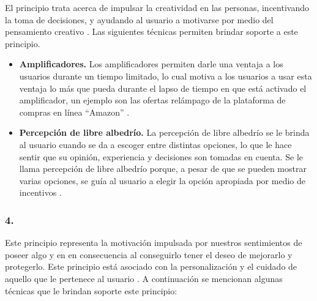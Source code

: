  El principio trata acerca de impulsar la creatividad en las personas, incentivando la toma de
 decisiones, y ayudando al usuario a motivarse por medio del pensamiento creativo \cite[p. 126]{Octalysis}.
 Las siguientes técnicas permiten brindar soporte a este principio.

    \begin{itemize}
    \item
    {\bf Amplificadores.}
        Los amplificadores permiten darle una ventaja a los usuarios durante un tiempo limitado,
        lo cual motiva a los usuarios a usar esta ventaja lo más que pueda durante el lapso de tiempo
        en que está activado el amplificador, un ejemplo son las ofertas relámpago de la plataforma
        de compras en línea ``Amazon'' \cite[p. 146]{Octalysis}.


    \item
    {\bf Percepción de libre albedrío.}
        La percepción de libre albedrío se le brinda al usuario cuando se da a escoger entre distintas
        opciones, lo que le hace sentir que su opinión, experiencia y decisiones son tomadas en cuenta.
        Se le llama percepción de libre albedrío porque, a pesar de que se pueden mostrar varias opciones,
        se guía al usuario a elegir la opción apropiada por medio de incentivos \cite[p. 150]{Octalysis}.
    \end{itemize}

\subsubsection{4. \principioIV} \label{subsec:principioIV}

 Este principio representa la motivación impulsada por nuestros sentimientos de poseer algo y en
 en consecuencia al conseguirlo tener el deseo de mejorarlo y protegerlo. %
 Este principio está asociado con la personalización y el cuidado de aquello que le pertenece al usuario
 \cite[p. 161]{Octalysis}. A continuación se mencionan algunas técnicas que le brindan soporte este
 principio:

